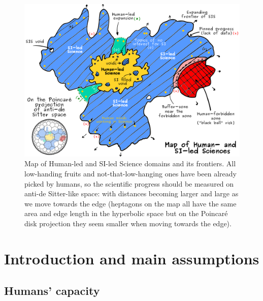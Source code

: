 \documentclass[a4paper,11pt]{article}
\begin{document}
\begin{figure}[htb!]
    \centering\includegraphics[width=1\textwidth]{map}
    \caption{\label{fig:map}Map of Human-led and SI-led Science domains and its frontiers. All low-handing fruits and not-that-low-hanging ones have been already picked by humans, so the scientific progress should be measured on anti-de Sitter-like space: with distances becoming larger and large as we move towards the edge (heptagons on the map all have the same area and edge length in the hyperbolic space but on the Poincaré disk projection they seem smaller when moving towards the edge).}
\end{figure}

\newpage




	\section{Introduction and main assumptions}

        \subsection{Humans' capacity} %
\end{document}
